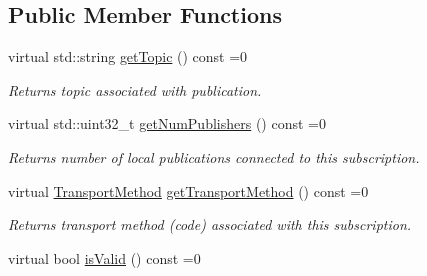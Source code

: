 \subsection*{Public Member Functions}
\begin{DoxyCompactItemize}
\item 
\mbox{\label{classflow__ros_1_1routing_1_1_subscription_wrapper_a2ef27475e7b7d7555e90d02cdc220b88}} 
virtual std\+::string \hyperlink{classflow__ros_1_1routing_1_1_subscription_wrapper_a2ef27475e7b7d7555e90d02cdc220b88}{get\+Topic} () const =0
\begin{DoxyCompactList}\small\item\em Returns topic associated with publication. \end{DoxyCompactList}\item 
\mbox{\label{classflow__ros_1_1routing_1_1_subscription_wrapper_a8ae55d34a07c505dc2b4bcb2440b2d32}} 
virtual std\+::uint32\+\_\+t \hyperlink{classflow__ros_1_1routing_1_1_subscription_wrapper_a8ae55d34a07c505dc2b4bcb2440b2d32}{get\+Num\+Publishers} () const =0
\begin{DoxyCompactList}\small\item\em Returns number of local publications connected to this subscription. \end{DoxyCompactList}\item 
\mbox{\label{classflow__ros_1_1routing_1_1_subscription_wrapper_a063fcc10600ef657620e2b58ce1fca85}} 
virtual \hyperlink{transport__info_8h_ae57afcf849a5bdb82b958347c6ccc57b}{Transport\+Method} \hyperlink{classflow__ros_1_1routing_1_1_subscription_wrapper_a063fcc10600ef657620e2b58ce1fca85}{get\+Transport\+Method} () const =0
\begin{DoxyCompactList}\small\item\em Returns transport method (code) associated with this subscription. \end{DoxyCompactList}\item 
\mbox{\label{classflow__ros_1_1routing_1_1_subscription_wrapper_a0f23052807c3533d28168d7c681a221e}} 
virtual bool \hyperlink{classflow__ros_1_1routing_1_1_subscription_wrapper_a0f23052807c3533d28168d7c681a221e}{is\+Valid} () const =0

\end{DoxyCompactItemize}
